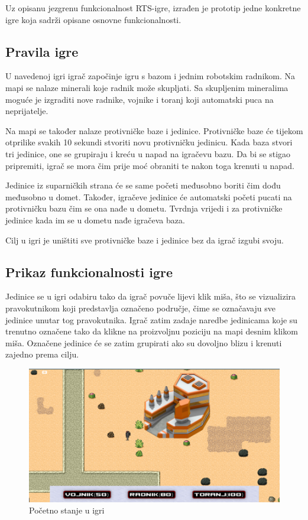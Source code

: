 \documentclass[times, utf8, zavrsni, numeric]{fer}
\begin{document}
\par Uz opisanu jezgrenu funkcionalnost RTS-igre, izrađen je prototip jedne konkretne igre koja sadrži opisane osnovne funkcionalnosti.

\subsection{Pravila igre}

\par U navedenoj igri igrač započinje igru s bazom i jednim robotskim radnikom.
Na mapi se nalaze minerali koje radnik može skupljati.
Sa skupljenim mineralima moguće je izgraditi nove radnike, vojnike i toranj koji automatski puca na neprijatelje.

\par Na mapi se također nalaze protivničke baze i jedinice.
Protivničke baze će tijekom otprilike svakih 10 sekundi stvoriti novu protivničku jedinicu.
Kada baza stvori tri jedinice, one se grupiraju i kreću u napad na igračevu bazu.
Da bi se stigao pripremiti, igrač se mora čim prije moć obraniti te nakon toga krenuti u napad.

\par Jedinice iz suparničkih strana će se same početi međusobno boriti čim dođu međusobno u domet.
Također, igračeve jedinice će automatski početi pucati na protivničku bazu čim se ona nađe u dometu.
Tvrdnja vrijedi i za protivničke jedinice kada im se u dometu nađe igračeva baza.

\par Cilj u igri je uništiti sve protivničke baze i jedinice bez da igrač izgubi svoju.

\subsection{Prikaz funkcionalnosti igre}

\par Jedinice se u igri odabiru tako da igrač povuče lijevi klik miša, što se vizualizira pravokutnikom koji predstavlja označeno područje, čime se označavaju sve jedinice unutar tog pravokutnika.
Igrač zatim zadaje naredbe jedinicama koje su trenutno označene tako da klikne na proizvoljnu poziciju na mapi desnim klikom miša.
Označene jedinice će se zatim grupirati ako su dovoljno blizu i krenuti zajedno prema cilju.

\begin{figure}[h]
	\centering
	\includegraphics[width=0.9\linewidth]{images/gameStart.png}
	\caption{Početno stanje u igri}
	\label{fig:gameStart}
\end{figure}
\end{document}
